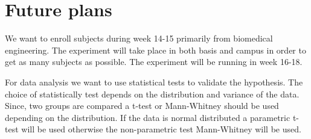 \chapter{Future plans}
We want to enroll subjects during week 14-15 primarily from biomedical engineering. The experiment will take place in both basis and campus in order to get as many subjects as possible. The experiment will be running in week 16-18.

For data analysis we want to use statistical tests to validate the hypothesis. The choice of statistically test depends on the distribution and variance of the data. Since, two groups are compared a t-test or Mann-Whitney should be used depending on the distribution. If the data is normal distributed a parametric t-test will be used otherwise the non-parametric test Mann-Whitney will be used.  

